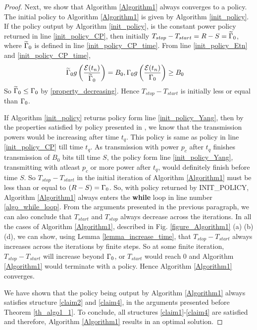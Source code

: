 \begin{proof}
Next, we show that Algorithm \ref{Algorithm1} always converges to a policy. The initial policy to Algorithm \ref{Algorithm1} is given by Algorithm \ref{init_policy}. If the policy output by Algorithm \ref{init_policy}, is the constant power policy returned in line \ref{init_policy_CP}, then initially $T_{stop}-T_{start}=R-S=\widetilde{\Gamma}_0$, where $\widetilde{\Gamma}_0$ is defined in line \ref{init_policy_CP_time}. From line \ref{init_policy_Etn} and \ref{init_policy_CP_time}, 
\begin{align}
& \widetilde{\Gamma}_0g\left(\dfrac{\mathcal{E}(t_n)}{\widetilde{\Gamma}_0}\right) = B_0, \Gamma_0g\left(\dfrac{\mathcal{E}(t_n)}{\Gamma_0}\right) \ge B_0
\end{align}    
So $\widetilde{\Gamma}_0\le \Gamma_0$ by \eqref{property_decreasing}. Hence $T_{stop}-T_{start}$ is initially less or equal than $\Gamma_0$.

If Algorithm \ref{init_policy} returns policy form line \ref{init_policy_Yang}, then by the properties satisfied by policy presented in \cite{Yang}, we know that the transmission powers would be increasing after time $t_q$. This policy is same as policy in line \ref{init_policy_CP} till time $t_q$. As transmission with power $p_c$ after $t_q$ finishes transmission of $B_0$ bits till time $S$, the policy form line \ref{init_policy_Yang}, transmitting with atleast $p_c$ or more power after $t_q$, would definitely finish before time $S$. So $T_{stop}-T_{start}$ in the initial iteration of Algorithm \ref{Algorithm1} must be less than or equal to $(R-S)=\Gamma_0$. So, with policy returned by INIT\_POLICY, Algorithm \ref{Algorithm1} always enters the \textbf{while} loop in line number \ref{algo_while_loop}. From the arguments presented in the previous paragraph, we can also conclude that $T_{start}$ and $T_{stop}$ always decrease across the iterations. In all the cases of Algorithm \ref{Algorithm1}, described in Fig. \ref{figure_Algorithm1} (a) (b) (d), we can show, using Lemma \ref{lemma_increase_time}, that $T_{stop}-T_{start}$ always increases across the iterations by finite steps. So at some finite iteration, $T_{stop}-T_{start}$ will increase beyond $\Gamma_0$, or $T_{start}$ would reach 0 and Algorithm \ref{Algorithm1} would terminate with a policy. Hence Algorithm \ref{Algorithm1} converges.
 
We have shown that the policy being output by Algorithm \ref{Algorithm1} always satisfies structure \eqref{claim2} and \eqref{claim4}, in the arguments presented before Theorem \ref{th_algo1_1}. To conclude, all structures \eqref{claim1}-\eqref{claim4} are satisfied and therefore, Algorithm \ref{Algorithm1} results in an optimal solution.


\end{proof}
